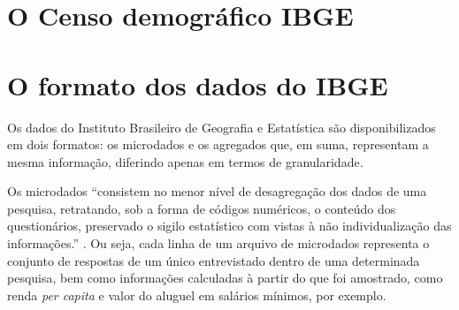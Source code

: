 


\section{O Censo demográfico IBGE}


\section{O formato dos dados do IBGE}

    Os dados do Instituto Brasileiro de Geografia e Estatística são disponibilizados em dois formatos: os microdados e os agregados que, em suma, representam a mesma informação, diferindo apenas em termos de granularidade.

    Os microdados ``consistem no menor nível de desagregação dos dados de uma pesquisa, retratando, sob a forma de códigos numéricos, o conteúdo dos questionários, preservado o sigilo estatístico com vistas à não individualização das informações.'' \cite{microdados}. Ou seja, cada linha de um arquivo de microdados representa o conjunto de respostas de um único entrevistado dentro de uma determinada pesquisa, bem como informações calculadas à partir do que foi amostrado, como renda \textit{per capita} e valor do aluguel em salários mínimos, por exemplo.

